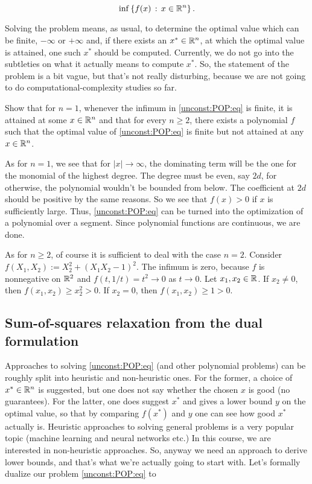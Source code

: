 \begin{equation}
	\inf \left\{ f(x) \,:\, x \in \mathbb{R}^n \right\}. \label{unconst:POP:eq}
\end{equation}

Solving the problem means, as usual, to determine the optimal value which can be finite, $-\infty$ or $+\infty$ and, if there exists an $x^\ast \in \mathbb{R}^n$, at which the optimal value is attained, one such $x^\ast$ should be computed. Currently, we do not go into the subtleties on what it actually means to compute $x^\ast$. So, the statement of the problem is a bit vague, but that's not really disturbing, because we are not going to do computational-complexity studies so far. 


\begin{exercise}
	Show that for $n=1$, whenever the infimum in \eqref{unconst:POP:eq} is finite, it is attained at some $x \in \mathbb{R}^n$ and that for every $n \ge 2$, there exists a polynomial $f$ such that the optimal value of \eqref{unconst:POP:eq} is finite but not attained at any $x \in \mathbb{R}^n$. 
\end{exercise}
\begin{solution}
	As for $n=1$, we see that for $|x| \to \infty$, the dominating term will be the one for the monomial of the highest degree. The degree must be even, say $2d$, for otherwise, the polynomial wouldn't be bounded from below. The coefficient at $2d$ should be positive by the same reasons. So we see that $f(x)>0$ if $x$ is sufficiently large. Thus, \eqref{unconst:POP:eq} can be turned into the optimization of a polynomial over a  segment. Since polynomial functions are continuous, we are done. 
	
	As for $n \ge 2$, of course it is sufficient to deal with the case $n=2$. Consider $f(X_1,X_2) := X_2^2 + (X_1 X_2 -1)^2$. The infimum is zero, because $f$ is nonnegative on $\mathbb{R}^2$ and $f(t,1/t) = t^2 \to 0$ as $t \to 0$. Let $x_1, x_2 \in \mathbb{R}$. If $x_2 \ne 0$, then $f(x_1,x_2) \ge x_2^2 > 0$. If $x_2=0$, then $f(x_1,x_2) \ge 1 > 0$. 
\end{solution}

\subsection{Sum-of-squares relaxation from the dual formulation}

Approaches to solving \eqref{unconst:POP:eq} (and other polynomial problems) can be roughly split into heuristic and non-heuristic ones. For the former, a choice of $x^\ast \in \mathbb{R}^n$ is suggested, but one does not say whether the chosen $x$ is good (no guarantees). For the latter, one does suggest $x^\ast$ and gives a lower bound $y$ on the optimal value, so that by comparing $f(x^\ast)$ and $y$ one can see how good $x^\ast$ actually is. Heuristic approaches to solving general problems is a very popular topic (machine learning and neural networks etc.) In this course, we are interested in non-heuristic approaches. So, anyway we need an approach to derive lower bounds, and that's what we're actually going to start with. Let's formally dualize our problem \eqref{unconst:POP:eq} to

